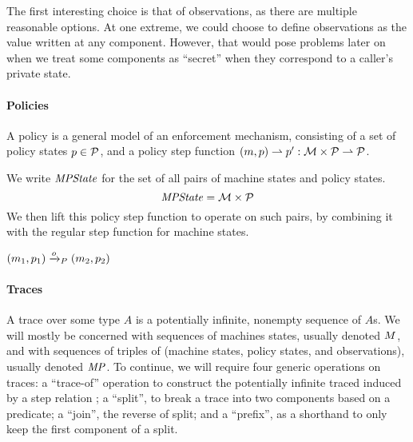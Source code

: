 \documentclass[acmsmall,review,anonymous]{acmart}\settopmatter{printfolios=true,printccs=false,printacmref=false}
\begin{document}
The first interesting choice is that of observations, as there are
multiple reasonable options. At one extreme, we could choose to define
observations as the value written at any component. However, that
would pose problems later on when we treat some components as ``secret''
when they correspond to a caller's private state. 

\paragraph*{Policies}

A policy is a general model of an enforcement mechanism, consisting of
a set of policy states \(p \in \mathcal{P}\), and a policy step function
\((m, p) \rightharpoonup p' : {\mathcal M} \times \mathcal{P}
\rightharpoonup \mathcal{P}\).

We write $\mathit{MPState}$ for the set of all pairs of machine states and policy
states.
%
\[\mathit{MPState} = {\mathcal M} \times \mathcal{P}\]
%
We then lift this policy step function to operate on such pairs,
by combining it with the regular step function for machine states.

            {\((m_1,p_1) \xrightarrow{o}_P (m_2,p_2)\)}



\paragraph{Traces}

A trace over some type $A$ is a potentially infinite, nonempty
sequence of $A$s. We will mostly be concerned with sequences of
machines states, usually denoted $M$, and with sequences of
triples of (machine states, policy states, and observations), usually
denoted $\mathit{MP}$.
To continue, we will require four generic operations
on traces: a ``trace-of'' operation to construct the potentially
infinite traced induced by a step relation
;
a ``split'', to break a
trace into two components based on a predicate; a ``join'', the
reverse of split; and a ``prefix'', as a shorthand to only keep the
first component of a split.
\end{document}
